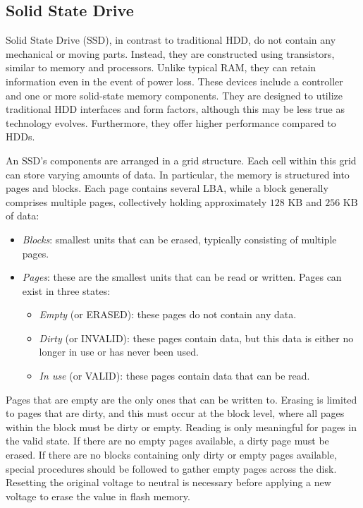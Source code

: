 \subsection{Solid State Drive}
Solid State Drive (SSD), in contrast to traditional HDD, do not contain any mechanical or moving parts. 
Instead, they are constructed using transistors, similar to memory and processors. 
Unlike typical RAM, they can retain information even in the event of power loss.
These devices include a controller and one or more solid-state memory components. 
They are designed to utilize traditional HDD interfaces and form factors, although this may be less true as technology evolves. 
Furthermore, they offer higher performance compared to HDDs.

An SSD's components are arranged in a grid structure. 
Each cell within this grid can store varying amounts of data.
In particular, the memory is structured into pages and blocks. 
Each page contains several LBA, while a block generally comprises multiple pages, collectively holding approximately $128\text{ KB}$ and $256\text{ KB}$ of data: 
\begin{itemize}
    \item \textit{Blocks}: smallest units that can be erased, typically consisting of multiple pages. 
    \item \textit{Pages}: these are the smallest units that can be read or written. 
        Pages can exist in three states:
        \begin{itemize}
            \item \textit{Empty} (or ERASED): these pages do not contain any data.
            \item \textit{Dirty} (or INVALID): these pages contain data, but this data is either no longer in use or has never been used.
            \item \textit{In use} (or VALID): these pages contain data that can be read.
        \end{itemize}
\end{itemize}
Pages that are empty are the only ones that can be written to. 
Erasing is limited to pages that are dirty, and this must occur at the block level, where all pages within the block must be dirty or empty. 
Reading is only meaningful for pages in the valid state. 
If there are no empty pages available, a dirty page must be erased. 
If there are no blocks containing only dirty or empty pages available, special procedures should be followed to gather empty pages across the disk.
Resetting the original voltage to neutral is necessary before applying a new voltage to erase the value in flash memory. 

